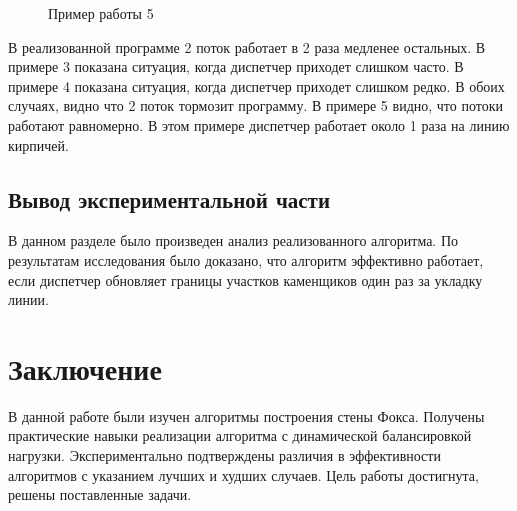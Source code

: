 \begin{figure}[H]
    \center{\texttt{[image: w5]}}
    \caption{Пример работы 5}
    \label{ris:w5}
\end{figure}

В реализованной программе 2 поток работает в 2 раза медленее остальных.
В примере 3 показана ситуация, когда диспетчер приходет слишком часто.
В примере 4 показана ситуация, когда диспетчер приходет слишком редко.
В обоих случаях, видно что 2 поток тормозит программу. В примере 5 видно, что потоки работают равномерно. 
В этом примере диспетчер работает около 1 раза на линию кирпичей.

\section{Вывод экспериментальной части}\label{experimentresult}

В данном разделе было произведен анализ реализованного алгоритма. По
результатам исследования было доказано, что алгоритм эффективно работает, если диспетчер обновляет границы участков каменщиков
один раз за укладку линии.

\chapter*{Заключение}\label{exit}

В данной работе были изучен алгоритмы построения стены Фокса. 
Получены практические навыки реализации алгоритма с динамической балансировкой нагрузки. 
Экспериментально подтверждены различия в эффективности алгоритмов с указанием лучших и худших случаев. 
Цель работы достигнута, решены поставленные задачи. 
